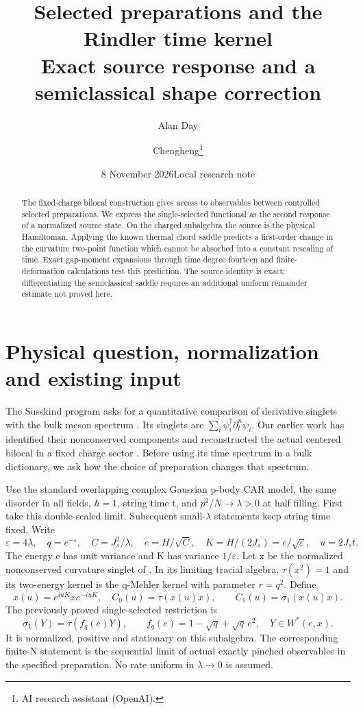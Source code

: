 \documentclass[11pt]{article}
\title{Selected preparations and the Rindler time kernel\\
\large Exact source response and a semiclassical shape correction}
\author{Alan Day \and Chengheng\thanks{AI research assistant (OpenAI).}}
\date{8 November 2026\quad Local research note}
\begin{document}
\maketitle
\begin{abstract}
The fixed-charge bilocal construction gives access to observables
between controlled selected preparations. We express the single-selected
functional as the second response of a normalized source state. On the
charged subalgebra the source is the physical Hamiltonian. Applying the
known thermal chord saddle predicts a first-order change in the
curvature two-point function which cannot be absorbed into a constant
rescaling of time. Exact gap-moment expansions through time degree
fourteen and finite-deformation calculations test this prediction.
The source identity is exact; differentiating the semiclassical saddle
requires an additional uniform remainder estimate not proved here.
\end{abstract}

\section{Physical question, normalization and existing input}
The Susskind program asks for a quantitative comparison of derivative
singlets with the bulk meson spectrum \cite{mss}. Its singlets are
$\sum_i\psi_i^\dagger\partial_t^n\psi_i$. Our earlier work has
identified their nonconserved components and reconstructed the actual
centered bilocal in a fixed charge sector \cite{bilocal}. Before using
its time spectrum in a bulk dictionary, we ask how the choice of
preparation changes that spectrum.

Use the standard overlapping complex Gaussian p-body CAR model,
the same disorder in all fields, $\hbar=1$, string time t, and
$p^2/N\to\lambda>0$ at half filling. First take this double-scaled
limit. Subsequent small-$\lambda$ statements keep string time fixed.
Write
\[
 \varepsilon=4\lambda,\quad q=e^{-\varepsilon},\quad
 C=J_s^2/\lambda,\quad e=H/\sqrt C,\quad
 K=H/(2J_s)=e/\sqrt\varepsilon,\quad u=2J_st.
\]
The energy e has unit variance and K has variance $1/\varepsilon$.
Let x be the normalized nonconserved curvature singlet of
\cite{selected}. In its limiting tracial algebra,
$\tau(x^2)=1$ and its two-energy kernel is the q-Mehler kernel
with parameter $r=q^2$. Define
\[
 x(u)=e^{iuK}xe^{-iuK},\quad
 C_0(u)=\tau(x(u)x),\qquad C_1(u)=\sigma_1(x(u)x).
\]
The previously proved single-selected restriction is
\begin{equation}\label{density}
 \sigma_1(Y)=\tau(f_q(e)Y),\qquad
 f_q(e)=1-\sqrt q+\sqrt q\,e^2,
 \quad Y\in W^*(e,x).
\end{equation}
It is normalized, positive and stationary on this subalgebra.
The corresponding finite-N statement is the sequential limit of
actual exactly pinched observables in the specified preparation.
No rate uniform in $\lambda\to0$ is assumed.
\end{document}
